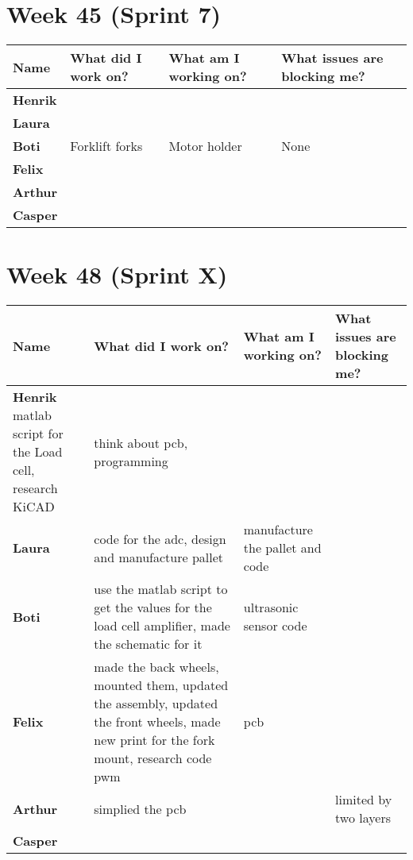 \documentclass[landscape]{article}
\begin{document}
    \section{Week 45 (Sprint 7)}
    \begin{table}[H]
        \begin{center}
            \begin{tabularx}{\linewidth}{L|L|L|L}
                
                \textbf{Name} & \textbf{What did I work on?} & \textbf{What am I working on? }& \textbf{What issues are blocking me?} \\
                \hline
                \textbf{Henrik} &  &  &  \\
                \hline
                \textbf{Laura} & & & \\
                \hline
                \textbf{Boti} & Forklift forks & Motor holder & None \\
                \hline
                \textbf{Felix} & & & \\
                \hline
                \textbf{Arthur} & & & \\
                \hline
                \textbf{Casper} &  &  & 
            \end{tabularx}
        \end{center}
    \end{table}

    \section{Week 48 (Sprint X)}
    \begin{table}[H]
        \begin{center}
            \begin{tabularx}{\linewidth}{L|L|L|L}
                
                \textbf{Name} & \textbf{What did I work on?} & \textbf{What am I working on? }& \textbf{What issues are blocking me?} \\
                \hline
                \textbf{Henrik} matlab script for the Load cell, research KiCAD & think about pcb, programming &  &  \\
                \hline
                \textbf{Laura} & code for the adc, design and manufacture pallet &  manufacture the pallet and code & \\
                \hline
                \textbf{Boti} &  use the matlab script to get the values for the load cell amplifier, made the schematic for it & ultrasonic sensor code & \\
                \hline
                \textbf{Felix} & made the back wheels, mounted them, updated the assembly, updated the front wheels, made new print for the fork mount, research code pwm & pcb & \\
                \hline
                \textbf{Arthur} & simplied the pcb & & limited by two layers\\
                \hline
                \textbf{Casper} &  &  & 
            \end{tabularx}
        \end{center}
    \end{table}
\end{document}
